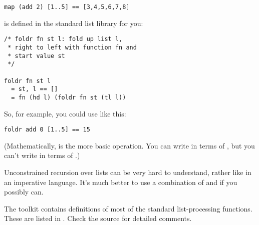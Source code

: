 \begin{verbatim}
map (add 2) [1..5] == [3,4,5,6,7,8]
\end{verbatim}

 is defined in the standard list library for you:

\begin{verbatim}
/* foldr fn st l: fold up list l, 
 * right to left with function fn and 
 * start value st
 */
 
foldr fn st l
  = st, l == []
  = fn (hd l) (foldr fn st (tl l)) 
\end{verbatim}

\noindent
So, for example, you could use  like this:

\begin{verbatim}
foldr add 0 [1..5] == 15
\end{verbatim}

\noindent
(Mathematically,  is the more basic operation. You can write
 in terms of , but you can't write  in terms of
.)

Unconstrained recursion over lists can be very hard to understand, rather like
 in an imperative language. It's much better to use a combination of
 and  if you possibly can.

The toolkit  contains definitions of most of the standard
list-processing functions. These are listed in . Check the
source for detailed comments.

